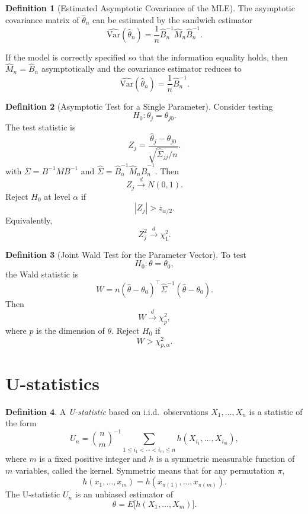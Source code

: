 \documentclass[11pt]{article}
\theoremstyle{definition}
\newtheorem{defn}{Definition}[section]
\begin{document}
\begin{defn}[Estimated Asymptotic Covariance of the MLE]
The asymptotic covariance matrix of $\hat\theta_n$ can be estimated by the
sandwich estimator
\[
\widehat{\mathrm{Var}}(\hat\theta_n)
=
\frac{1}{n}
\hat B_n^{-1}\hat M_n\hat B_n^{-1}.
\]
\end{defn}
If the model is correctly specified so that the information equality holds,
then $\hat M_n=\hat B_n$ asymptotically and the covariance estimator reduces to
\[
\widehat{\mathrm{Var}}(\hat\theta_n)
=
\frac{1}{n}\hat B_n^{-1}.
\]
\begin{defn}[Asymptotic Test for a Single Parameter]
Consider testing
\[
H_0:\theta_j=\theta_{j0}.
\]
The test statistic is
\[
Z_j
=
\frac{\hat\theta_j-\theta_{j0}}
{\sqrt{\hat\Sigma_{jj}/n}}.
\]
with $\Sigma = B^{-1}MB^{-1}$ and $\hat\Sigma=
\hat B_n^{-1}\hat M_n\hat B_n^{-1}.$
Then
\[
Z_j \xrightarrow{d} N(0,1).
\]
Reject $H_0$ at level $\alpha$ if
\[
|Z_j|>z_{\alpha/2}.
\]
Equivalently,
\[
Z_j^2 \xrightarrow{d} \chi^2_1.
\]
\end{defn}
\begin{defn}[Joint Wald Test for the Parameter Vector]
To test
\[
H_0:\theta=\theta_0,
\]
the Wald statistic is
\[
W
=
n(\hat\theta-\theta_0)^\top
\hat\Sigma^{-1}
(\hat\theta-\theta_0).
\]
Then
\[
W \xrightarrow{d} \chi^2_p,
\]
where $p$ is the dimension of $\theta$.
Reject $H_0$ if
\[
W>\chi^2_{p,\alpha}.
\]
\end{defn}
\newpage
\section{U-statistics}
\begin{defn}
A \emph{U-statistic} based on i.i.d.\ observations \(X_1,\dots,X_n\) is a statistic of the form
\[
U_n=\binom{n}{m}^{-1}\sum_{1\le i_1<\cdots<i_m\le n} h(X_{i_1},\dots,X_{i_m}),
\]
where \(m\) is a fixed positive integer and \(h\) is a symmetric measurable function of \(m\) variables, called the kernel. Symmetric means that for any permutation \(\pi\),
\[
h(x_1,\dots,x_m)=h(x_{\pi(1)},\dots,x_{\pi(m)}).
\]
The U-statistic \(U_n\) is an unbiased estimator of
\[
\theta = E\bigl[h(X_1,\dots,X_m)\bigr].
\]
\end{defn}
\end{document}
